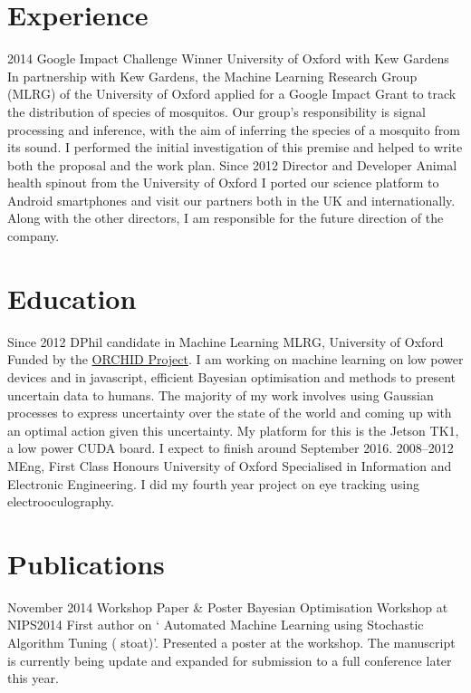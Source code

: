 \documentclass[4pt, print]{friggeri-cv}
\begin{document}
\section{Experience}
\begin{entrylist}
  \entry
    {2014}
    {Google Impact Challenge Winner}
    {University of Oxford with Kew Gardens}
    {In partnership with Kew Gardens, the Machine Learning Research Group (MLRG) of the University of Oxford applied for a Google Impact Grant to track the distribution of species of mosquitos. Our group's responsibility is signal processing and inference, with the aim of inferring the species of a mosquito from its sound. I performed the initial investigation of this premise and helped to write both the proposal and the work plan.}
  \entry
    {Since 2012}
    {Director and Developer}
    {Animal health spinout from the University of Oxford}
    {I ported our science platform to Android smartphones and visit our partners both in the UK and internationally. Along with the other directors, I am responsible for the future direction of the company.}

\end{entrylist}


\section{Education}
\begin{entrylist}
  \entry
    {Since 2012}
    {DPhil {\normalfont candidate in Machine Learning}}
    {MLRG, University of Oxford}
    {Funded by the \href{http://www.orchid.ac.uk/}{ORCHID Project}. I am working on machine learning on low power devices and in javascript, efficient Bayesian optimisation and methods to present uncertain data to humans. The majority of my work involves using Gaussian processes to express uncertainty over the state of the world and coming up with an optimal action given this uncertainty. My platform for this is the Jetson TK1, a low power CUDA board. I expect to finish around \boldfont{} September 2016.}
  \entry
    {2008–2012}
    {MEng, {\normalfont First Class Honours}}
    {University of Oxford}
    {Specialised in Information and Electronic Engineering. I did my fourth   year project on eye tracking using electrooculography.}

 
\end{entrylist}

\section{Publications}
\begin{entrylist}
   \entry
{November 2014}
{Workshop Paper \& Poster}
{Bayesian Optimisation Workshop at NIPS2014}
{First author on `{\boldfont{} Automated Machine Learning using Stochastic Algorithm Tuning ({\thinboldfont{} stoat})}'. Presented a poster at the workshop. The manuscript is currently being update and expanded for submission to a full conference later this year.}
\end{entrylist}
\end{document}
